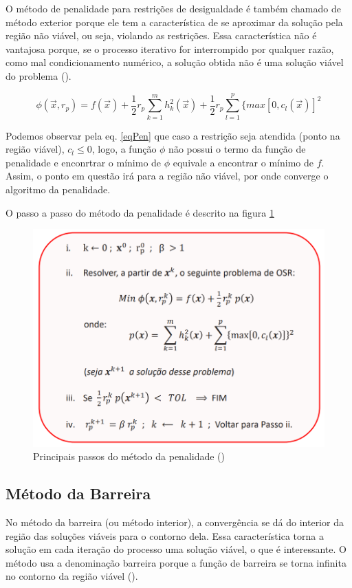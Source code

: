 \documentclass[10pt, a4paper]{article}
\begin{document}
O m\'etodo de penalidade para restri\c c\~oes de desigualdade \'e tamb\'em chamado de m\'etodo exterior porque ele tem a caracter\'istica de se aproximar da solu\c c\~ao pela regi\~ao n\~ao vi\'avel, ou seja, violando as restri\c c\~oes. Essa caracter\'istica n\~ao \'e vantajosa porque, se o processo iterativo for interrompido por qualquer raz\~ao, como mal condicionamento num\'erico, a solu\c c\~ao obtida n\~ao \'e uma solu\c c\~ao vi\'avel do problema (\cite{apostila}).

\begin{equation} \label{eqPen}
      \phi (\vec{x}, r_p) = f(\vec{x}) + \frac{1}{2} r_p \sum_{k=1}^{m} h_k^2(\vec{x}) + \frac{1}{2} r_p \sum_{l=1}^{p} \{max[0,c_l(\vec{x})]^2
\end{equation}

Podemos observar pela eq. \ref{eqPen} que caso a restri\c c\~ao seja atendida (ponto na regi\~ao vi\'avel), $c_l \leq 0$, logo, a fun\c c\~ao $\phi$ n\~ao possui o termo da fun\c c\~ao de penalidade e enconrtrar o m\'inimo de $\phi$ equivale a encontrar o m\'inimo de $f$. Assim, o ponto em quest\~ao ir\'a para a regi\~ao n\~ao vi\'avel, por onde converge o algoritmo da penalidade.

O passo a passo do m\'etodo da penalidade \'e descrito na figura \ref{fig:algoritmoPenalidade}

\begin{figure}[H]
      \centering
      \includegraphics[width=.6\textwidth]{algoritmoPenalidade.PNG}
      \caption{Principais passos do m\'etodo da penalidade (\cite{ppt})}
      \label{fig:algoritmoPenalidade}
\end{figure}

\subsection{M\'etodo da Barreira}

No m\'etodo da barreira (ou m\'etodo interior), a converg\^encia se d\'a do interior da regi\~ao das solu\c c\~oes vi\'aveis para o contorno dela. Essa caracter\'istica torna a solu\c c\~ao em cada itera\c c\~ao do processo uma solu\c c\~ao vi\'avel, o que \'e interessante. O m\'etodo usa a denomina\c c\~ao barreira porque a fun\c c\~ao de barreira se torna infinita no contorno da regi\~ao vi\'avel (\cite{apostila}).
\end{document}
